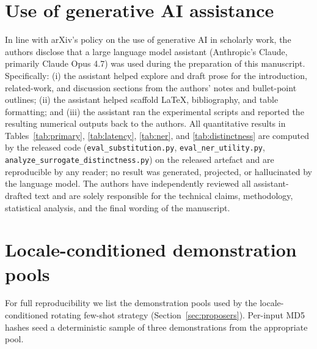 \documentclass[11pt]{article}
\newcommand{\code}[1]{\texttt{#1}}
\begin{document}
\section*{Use of generative AI assistance}
\label{sec:aiuse}

In line with arXiv's policy on the use of generative AI in scholarly
work, the authors disclose that a large language model assistant
(Anthropic's Claude, primarily Claude Opus 4.7) was used during the
preparation of this manuscript. Specifically: (i) the assistant
helped explore and draft prose for the introduction, related-work,
and discussion sections from the authors' notes and bullet-point
outlines; (ii) the assistant helped scaffold LaTeX, bibliography, and
table formatting; and (iii) the assistant ran the experimental
scripts and reported the resulting numerical outputs back to the
authors. All quantitative results in Tables~\ref{tab:primary},
\ref{tab:latency}, \ref{tab:ner}, and \ref{tab:distinctness} are
computed by the released code (\code{eval\_substitution.py},
\code{eval\_ner\_utility.py}, \code{analyze\_surrogate\_distinctness.py})
on the released artefact and are reproducible by any reader; no
result was generated, projected, or hallucinated by the language
model. The authors have independently reviewed all assistant-drafted
text and are solely responsible for the technical claims, methodology,
statistical analysis, and the final wording of the manuscript.




\appendix
\section{Locale-conditioned demonstration pools}
\label{app:pools}

For full reproducibility we list the demonstration pools used by the
locale-conditioned rotating few-shot strategy
(Section~\ref{sec:proposers}). Per-input MD5 hashes seed a deterministic
sample of three demonstrations from the appropriate pool.
\end{document}
